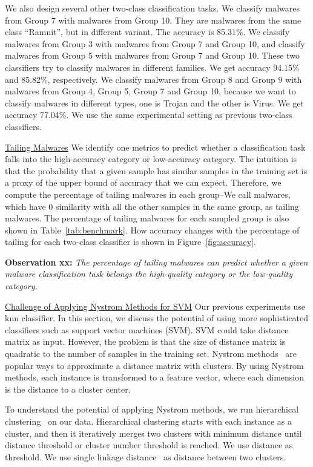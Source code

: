 We also design several other two-class classification tasks. 
We classify malwares from Group 7 with malwares from Group 10. 
They are malwares from the same class ``Ramnit'', but in different variant. 
The accuracy is 85.31\%. 
We classify malwares from Group 3 with malwares from Group 7 and Group 10, 
and classify malwares from Group 5 with malwares from Group 7 and Group 10. 
These two classifiers try to classify malwares in different families. 
We get accuracy 94.15\% and 85.82\%, respectively. 
We classify malwares from Group 8 and Group 9 with malwares from Group 4, Group 5, Group 7 and Group 10, 
because we want to classify malwares in different types, one is Trojan and the other is Virus. We get accuracy 77.04\%. 
We use the same experimental setting as previous two-class classifiers.  

\underline{Tailing Malwares}
We identify one metrics to predict whether
a classification task falls into the
high-accuracy category or low-accuracy
category. The intuition is that the probability
that a given sample has similar samples in
the training set is a proxy of the upper bound
of accuracy that we can expect. Therefore,
we compute the percentage of tailing malwares in each group--We call malwares, which have 0 similarity with all the other samples in the same group, as tailing malwares. 
The percentage of tailing malwares for each sampled group is also shown in Table~\ref{tab:benchmark}. 
How accuracy changes with the percentage of tailing for each two-class classifier is shown in Figure~\ref{fig:accuracy}. 

{\bf Observation xx:} 
{\em The percentage of tailing malwares
can predict whether a given malware classification task belongs
the high-quality category or the low-quality
category.}



\underline{Challenge of Applying Nystrom Methods for SVM}
Our previous experiments use knn classifier.
In this section, we discuss the potential of using
more sophisticated classifiers such as
support vector machines (SVM). 
SVM could take distance matrix as input.
However, the problem is that the size of distance matrix is quadratic to the number of samples in the training set. 
Nystrom methods~\cite{clustering-purpose} are popular ways to
approximate a distance matrix with clusters.
By using Nystrom methods, each instance is transformed to a feature vector, where each dimension is the distance to a cluster center. 

To understand the potential of applying Nystrom methods, we run hierarchical clustering~\cite{hcluster} on our data.
Hierarchical clustering starts with each instance as a cluster, 
and then it iteratively merges two clusters with minimum distance 
until distance threshold or cluster number threshold is reached. 
We use distance as threshold. 
We use single linkage distance~\cite{single-link} as distance between two clusters. 

